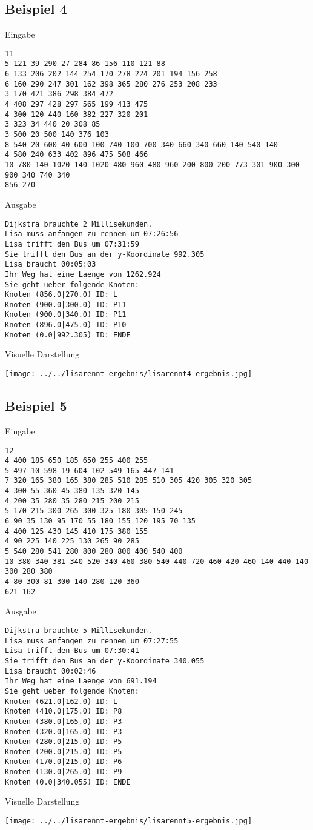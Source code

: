 \documentclass[a4paper,10pt,ngerman]{scrartcl}
\begin{document}
\subsection{Beispiel 4}
Eingabe
\begin{lstlisting}
11
5 121 39 290 27 284 86 156 110 121 88
6 133 206 202 144 254 170 278 224 201 194 156 258
6 160 290 247 301 162 398 365 280 276 253 208 233
3 170 421 386 298 384 472
4 408 297 428 297 565 199 413 475
4 300 120 440 160 382 227 320 201
3 323 34 440 20 308 85
3 500 20 500 140 376 103
8 540 20 600 40 600 100 740 100 700 340 660 340 660 140 540 140
4 580 240 633 402 896 475 508 466
10 780 140 1020 140 1020 480 960 480 960 200 800 200 773 301 900 300 900 340 740 340
856 270
\end{lstlisting}
Ausgabe
\begin{lstlisting}
Dijkstra brauchte 2 Millisekunden.
Lisa muss anfangen zu rennen um 07:26:56
Lisa trifft den Bus um 07:31:59
Sie trifft den Bus an der y-Koordinate 992.305
Lisa braucht 00:05:03
Ihr Weg hat eine Laenge von 1262.924
Sie geht ueber folgende Knoten:
Knoten (856.0|270.0) ID: L
Knoten (900.0|300.0) ID: P11
Knoten (900.0|340.0) ID: P11
Knoten (896.0|475.0) ID: P10
Knoten (0.0|992.305) ID: ENDE
\end{lstlisting}
Visuelle Darstellung
\begin{center}
\texttt{[image: ../../lisarennt-ergebnis/lisarennt4-ergebnis.jpg]} 
\end{center}
\subsection{Beispiel 5}
Eingabe
\begin{lstlisting}
12
4 400 185 650 185 650 255 400 255
5 497 10 598 19 604 102 549 165 447 141
7 320 165 380 165 380 285 510 285 510 305 420 305 320 305
4 300 55 360 45 380 135 320 145
4 200 35 280 35 280 215 200 215
5 170 215 300 265 300 325 180 305 150 245
6 90 35 130 95 170 55 180 155 120 195 70 135
4 400 125 430 145 410 175 380 155
4 90 225 140 225 130 265 90 285
5 540 280 541 280 800 280 800 400 540 400
10 380 340 381 340 520 340 460 380 540 440 720 460 420 460 140 440 140 300 280 380
4 80 300 81 300 140 280 120 360
621 162
\end{lstlisting}
Ausgabe
\begin{lstlisting}
Dijkstra brauchte 5 Millisekunden.
Lisa muss anfangen zu rennen um 07:27:55
Lisa trifft den Bus um 07:30:41
Sie trifft den Bus an der y-Koordinate 340.055
Lisa braucht 00:02:46
Ihr Weg hat eine Laenge von 691.194
Sie geht ueber folgende Knoten:
Knoten (621.0|162.0) ID: L
Knoten (410.0|175.0) ID: P8
Knoten (380.0|165.0) ID: P3
Knoten (320.0|165.0) ID: P3
Knoten (280.0|215.0) ID: P5
Knoten (200.0|215.0) ID: P5
Knoten (170.0|215.0) ID: P6
Knoten (130.0|265.0) ID: P9
Knoten (0.0|340.055) ID: ENDE
\end{lstlisting}
Visuelle Darstellung
\begin{center}
\texttt{[image: ../../lisarennt-ergebnis/lisarennt5-ergebnis.jpg]} 
\end{center}
\end{document}
